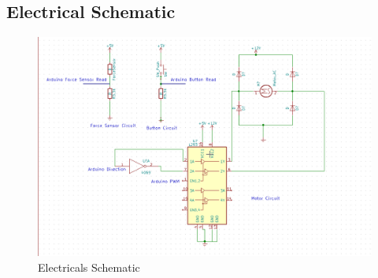 \documentclass[letterpaper, 10 pt, conference]{ieeeconf}  %
\begin{document}
\subsection{Electrical Schematic}

\begin{figure}[!htb]
	\centering
	\includegraphics[width=\linewidth]{schematic.png}
	\caption{Electricals Schematic}
	\label{fig:elec}
\end{figure}
\end{document}

